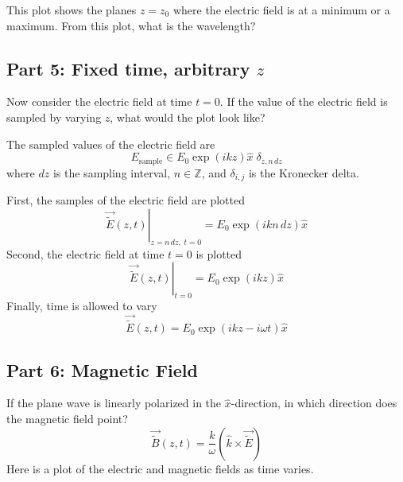 \documentclass{article}
\begin{document}
This plot shows the planes $z=z_0$ where the electric field is at a minimum or a maximum.  From this plot, what is the wavelength?
\subsection{Part 5: Fixed time, arbitrary $z$}
Now consider the electric field at time $t=0$.  If the value of the electric field is sampled by varying $z$, what would the plot look like?

The sampled values of the electric field are
\begin{equation}
    E_{\text{sample}} \in E_0 \exp \left(ikz\right) \hat{x} \;\delta_{z,n\,dz}
\end{equation}
where $dz$ is the sampling interval, $n \in \mathbb{Z}$, and $\delta_{i,j}$ is the Kronecker delta.

First, the samples of the electric field are plotted
\begin{equation}
    \left.\vec{\widetilde{E}}\left(z,t\right)\right\rvert_{z=n\,dz,\;t=0} = E_0 \exp \left(ikn\,dz\right) \hat{x}
\end{equation}
Second, the electric field at time $t=0$ is plotted
\begin{equation}
    \left.\vec{\widetilde{E}}\left(z,t\right)\right\rvert_{t=0} = E_0 \exp \left(ikz\right) \hat{x}
\end{equation}
Finally, time is allowed to vary
\begin{equation}
    \vec{\widetilde{E}}\left(z,t\right) = E_0 \exp \left(i kz - i \omega t\right) \hat{x}
\end{equation}
\subsection{Part 6: Magnetic Field}
If the plane wave is linearly polarized in the $\hat x$-direction, in which direction does the magnetic field point?
\begin{equation}
    \vec{\widetilde{B}}\left(z,t\right) =  \frac{k}{\omega} \left(\hat{k}\times\vec{\widetilde{E}}\right)
\end{equation}
Here is a plot of the electric and magnetic fields as time varies.
\end{document}

